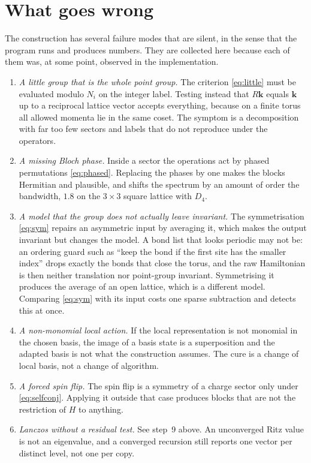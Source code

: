 \documentclass[12pt]{article}
\begin{document}
\section{What goes wrong}\label{sec:pitfalls}

The construction has several failure modes that are silent, in the sense that
the program runs and produces numbers. They are collected here because each of
them was, at some point, observed in the implementation.

\begin{enumerate}
\item \emph{A little group that is the whole point group.} The criterion
\eqref{eq:little} must be evaluated modulo $N_i$ on the integer label. Testing
instead that $R\mathbf{k}$ equals $\mathbf{k}$ up to a reciprocal lattice vector
accepts everything, because on a finite torus all allowed momenta lie in the same
coset. The symptom is a decomposition with far too few sectors and labels that do
not reproduce under the operators.

\item \emph{A missing Bloch phase.} Inside a sector the operations act by phased
permutations \eqref{eq:phased}. Replacing the phases by one makes the blocks
Hermitian and plausible, and shifts the spectrum by an amount of order the
bandwidth, $1.8$ on the $3\times3$ square lattice with $D_4$.

\item \emph{A model that the group does not actually leave invariant.} The
symmetrisation \eqref{eq:sym} repairs an asymmetric input by averaging it, which
makes the output invariant but changes the model. A bond list that looks
periodic may not be: an ordering guard such as ``keep the bond if the first site
has the smaller index'' drops exactly the bonds that close the torus, and the raw
Hamiltonian is then neither translation nor point-group invariant. Symmetrising
it produces the average of an open lattice, which is a different model.
Comparing \eqref{eq:sym} with its input costs one sparse subtraction and detects
this at once.

\item \emph{A non-monomial local action.} If the local representation is not
monomial in the chosen basis, the image of a basis state is a superposition and
the adapted basis is not what the construction assumes. The cure is a change of
local basis, not a change of algorithm.

\item \emph{A forced spin flip.} The spin flip is a symmetry of a charge sector
only under \eqref{eq:selfconj}. Applying it outside that case produces blocks
that are not the restriction of $H$ to anything.

\item \emph{Lanczos without a residual test.} See step~9 above. An unconverged
Ritz value is not an eigenvalue, and a converged recursion still reports one
vector per distinct level, not one per copy.
\end{enumerate}
\end{document}
